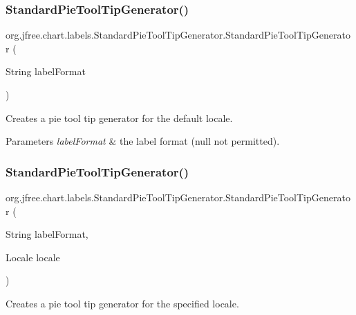 \subsubsection{\texorpdfstring{Standard\+Pie\+Tool\+Tip\+Generator()}{StandardPieToolTipGenerator()}\hspace{0.1cm}{\footnotesize\ttfamily [3/5]}}
{\footnotesize\ttfamily org.\+jfree.\+chart.\+labels.\+Standard\+Pie\+Tool\+Tip\+Generator.\+Standard\+Pie\+Tool\+Tip\+Generator (\begin{DoxyParamCaption}\item[{String}]{label\+Format }\end{DoxyParamCaption})}

Creates a pie tool tip generator for the default locale.


\begin{DoxyParams}{Parameters}
{\em label\+Format} & the label format ({\ttfamily null} not permitted). \\
\hline
\end{DoxyParams}
\mbox{\label{classorg_1_1jfree_1_1chart_1_1labels_1_1_standard_pie_tool_tip_generator_ab3ece860bf5795d061c48d45be218fea}} 
\subsubsection{\texorpdfstring{Standard\+Pie\+Tool\+Tip\+Generator()}{StandardPieToolTipGenerator()}\hspace{0.1cm}{\footnotesize\ttfamily [4/5]}}
{\footnotesize\ttfamily org.\+jfree.\+chart.\+labels.\+Standard\+Pie\+Tool\+Tip\+Generator.\+Standard\+Pie\+Tool\+Tip\+Generator (\begin{DoxyParamCaption}\item[{String}]{label\+Format,  }\item[{Locale}]{locale }\end{DoxyParamCaption})}

Creates a pie tool tip generator for the specified locale.


